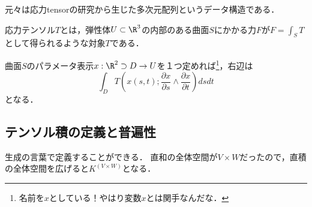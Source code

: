\documentclass[uplatex, dvipdfmx]{jsreport}
\begin{document}
\begin{history}
    元々は応力tensorの研究から生じた多次元配列というデータ構造である．
    \begin{definition}
        応力テンソル$T$とは，弾性体$U\subset\R^3$の内部のある曲面$S$にかかる力$F$が$F=\int_ST$として得られるような対象$T$である．
    \end{definition}
    曲面$S$のパラメータ表示$x:\R^2\supset D\to U$を１つ定めれば\footnote{名前を$x$としている！やはり変数$x$とは関手なんだな．}，右辺は
    \[\int_DT\left(x(s,t);\frac{\partial x}{\partial s}\wedge\frac{\partial x}{\partial t}\right)dsdt\]
    となる．
\end{history}

\subsection{テンソル積の定義と普遍性}

\begin{tcolorbox}[colframe=ForestGreen, colback=ForestGreen!10!white, breakable]
    生成の言葉で定義することができる．
    直和の全体空間が$V\times W$だったので，直積の全体空間を広げると$K^{(V\times W)}$となる．
\end{tcolorbox}
\end{document}
